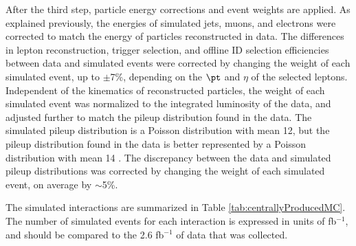 



After the third step, particle energy corrections and event weights are applied.  As explained previously, the energies of simulated jets, muons, 
and electrons were corrected to match the energy of particles reconstructed in data.  The differences in lepton reconstruction, trigger selection, 
and offline ID selection efficiencies between data and simulated events were corrected by changing the weight of each simulated event, up to 
$\pm$7\%, depending on the $\pt$ and $\eta$ of the selected leptons.  Independent of the kinematics of reconstructed particles, the weight of each 
simulated event was normalized to the integrated luminosity of the data, and adjusted further to match the pileup distribution found in the data.  The 
simulated pileup distribution is a Poisson distribution with mean 12, but the pileup distribution found in the data is better represented by a Poisson 
distribution with mean 14 \cite{lumi}.  The discrepancy between the data and simulated pileup distributions was corrected by changing the weight of 
each simulated event, on average by $\sim$5\%.

The simulated interactions are summarized in Table \ref{tab:centrallyProducedMC}.  The number of simulated events for each interaction is expressed 
in units of fb$^{-1}$, and should be compared to the 2.6 fb$^{-1}$ of data that was collected.

